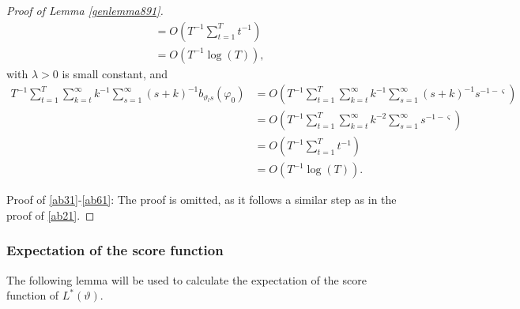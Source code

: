 {{\begin{proof}[Proof of Lemma \ref{genlemma891}]
\begin{align*}
    &= O( T^{-1}  \sum_{t = 1}^T t^{-1} ) \\
    &= O( T^{-1} \log(T)),
\end{align*}
with $\lambda > 0$ is small constant, and 
\begin{align*}
    T^{-1}  \sum_{t = 1}^T  \sum_{k = t}^{\infty} k^{-1} \sum_{s = 1}^{\infty} (s+k)^{-1} b_{\vartheta_l s}(\varphi_0)&= O(   T^{-1}  \sum_{t = 1}^T  \sum_{k = t}^{\infty} k^{-1} \sum_{s = 1}^{\infty} (s+k)^{-1} s^{-1-\varsigma}) \\
    &= O(   T^{-1}  \sum_{t = 1}^T  \sum_{k = t}^{\infty} k^{-2} \sum_{s = 1}^{\infty} s^{-1-\varsigma}) \\
    &= O(   T^{-1}  \sum_{t = 1}^T  t^{-1} ) \\
     &= O(   T^{-1}  \log(T) ). 
\end{align*}

Proof of \eqref{ab31}-\eqref{ab61}: The proof is omitted, as it follows a similar step as in the proof of \eqref{ab21}. 

\end{proof}

\subsubsection{Expectation of the score function}\label{UB3}

The following lemma will be used to calculate the expectation of the score function of $L^*(\vartheta)$. 

}}
